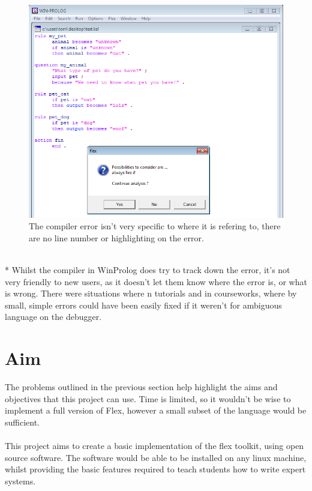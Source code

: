 \documentclass[12pt]{report}
\begin{document}
\begin{figure}[ht]
	\centering
		\includegraphics[scale=0.65]{flex_error2}
		\caption{The compiler error isn't very specific to where it is refering to, there are no line number or highlighting on the error.}
\end{figure}
\\*
Whilst the compiler in WinProlog does try to track down the error, it's not very friendly to new users, as it doesn't let them know where the error is, or what is wrong.  There were situations where n tutorials and in courseworks, where by small, simple errors could have been easily fixed if it weren't for ambiguous language on the debugger.
\clearpage
\section{Aim}\label{sec:aim}
The problems outlined in the previous section help highlight the aims and objectives that this project can use.  Time is limited, so it wouldn't be wise to implement a full version of Flex, however a small subset of the language would be sufficient.
\\
\\
This project aims to create a basic implementation of the flex toolkit, using open source software.  The software would be able to be installed on any linux machine, whilst providing the basic features required to teach students how to write expert systems.
\end{document}
